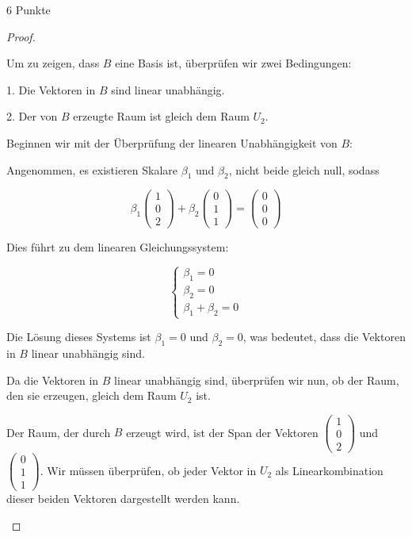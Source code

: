 \documentclass{problemset}
\begin{document}
\begin{problem}{6 Punkte}
\begin{proof}
\begin{enumerate}
		      Um zu zeigen, dass $B$ eine Basis ist, überprüfen wir zwei Bedingungen:

		      1. Die Vektoren in $B$ sind linear unabhängig.

		      2. Der von $B$ erzeugte Raum ist gleich dem Raum $U_2$.

		      Beginnen wir mit der Überprüfung der linearen Unabhängigkeit von $B$:

		      Angenommen, es existieren Skalare $\beta_1$ und $\beta_2$, nicht beide gleich null, sodass

		      \[
			      \beta_1 \begin{pmatrix} 1 \\ 0 \\ 2 \end{pmatrix} + \beta_2 \begin{pmatrix} 0 \\ 1 \\ 1 \end{pmatrix} = \begin{pmatrix} 0 \\ 0 \\ 0 \end{pmatrix}
		      \]

		      Dies führt zu dem linearen Gleichungssystem:

		      \[
			      \begin{cases}
				      \beta_1 = 0 \\
				      \beta_2 = 0 \\
				      \beta_1 + \beta_2 = 0
			      \end{cases}
		      \]

		      Die Lösung dieses Systems ist $\beta_1 = 0$ und $\beta_2 = 0$, was bedeutet, dass die Vektoren in $B$ linear unabhängig sind.

		      Da die Vektoren in $B$ linear unabhängig sind, überprüfen wir nun, ob der Raum, den sie erzeugen, gleich dem Raum $U_2$ ist.

		      Der Raum, der durch $B$ erzeugt wird, ist der Span der Vektoren $\begin{pmatrix} 1 \\ 0 \\ 2 \end{pmatrix}$ und $\begin{pmatrix} 0 \\ 1 \\ 1 \end{pmatrix}$. Wir müssen überprüfen, ob jeder Vektor in $U_2$ als Linearkombination dieser beiden Vektoren dargestellt werden kann.


\end{enumerate}
\end{proof}
\end{problem}
\end{document}
